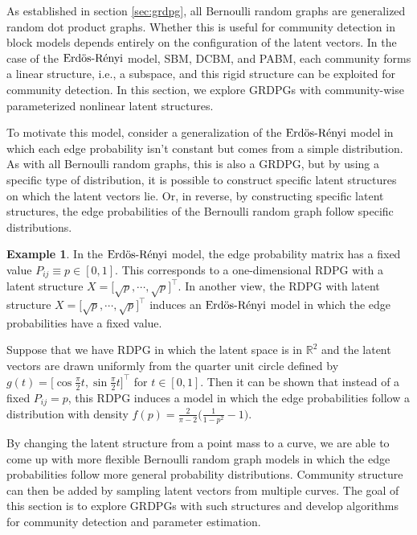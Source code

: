 \documentclass[
  12pt,
]{article}
\theoremstyle{definition}
\theoremstyle{definition}
\newtheorem{example}{Example}[section]
\theoremstyle{definition}
\theoremstyle{definition}
\theoremstyle{remark}
\begin{document}
As established in section \ref{sec:grdpg}, all Bernoulli random graphs are generalized random dot product graphs.
Whether this is useful for community detection in block models depends entirely on the configuration of the latent vectors.
In the case of the \(\text{Erd\"{o}s-R\'{e}nyi}\) model, SBM, DCBM, and PABM, each community forms a linear structure, i.e., a subspace, and this rigid structure can be exploited for community detection.
In this section, we explore GRDPGs with community-wise parameterized nonlinear latent structures.

To motivate this model, consider a generalization of the \(\text{Erd\"{o}s-R\'{e}nyi}\) model in which each edge probability isn't constant but comes from a simple distribution.
As with all Bernoulli random graphs, this is also a GRDPG, but by using a specific type of distribution, it is possible to construct specific latent structures on which the latent vectors lie.
Or, in reverse, by constructing specific latent structures, the edge probabilities of the Bernoulli random graph follow specific distributions.

\begin{example}
In the $\text{Erd\"{o}s-R\'{e}nyi}$ model, the edge probability matrix has a fixed value $P_{ij} \equiv p \in [0, 1]$. 
This corresponds to a one-dimensional RDPG with a latent structure $X = \Big[ \sqrt{p},  \cdots, \sqrt{p} \Big]^\top$. 
In another view, the RDPG with latent structure $X = \Big[ \sqrt{p}, \cdots, \sqrt{p} \Big]^\top$ induces an $\text{Erd\"{o}s-R\'{e}nyi}$ model in which the edge probabilities have a fixed value. 

Suppose that we have RDPG in which the latent space is in $\mathbb{R}^2$ and the latent vectors are drawn uniformly from the quarter unit circle defined by $g(t) = \Big[ \cos \frac{\pi}{2} t, \sin \frac{\pi}{2} t \Big]^\top$ for $t \in [0, 1]$. 
Then it can be shown that instead of a fixed $P_{ij} = p$, this RDPG induces a model in which the edge probabilities follow a distribution with density $f(p) = \frac{2}{\pi - 2} \Big( \frac{1}{1 - p^2} - 1 \Big)$. 
\end{example}

By changing the latent structure from a point mass to a curve, we are able to come up with more flexible Bernoulli random graph models in which the edge probabilities follow more general probability distributions.
Community structure can then be added by sampling latent vectors from multiple curves.
The goal of this section is to explore GRDPGs with such structures and develop algorithms for community detection and parameter estimation.
\end{document}
